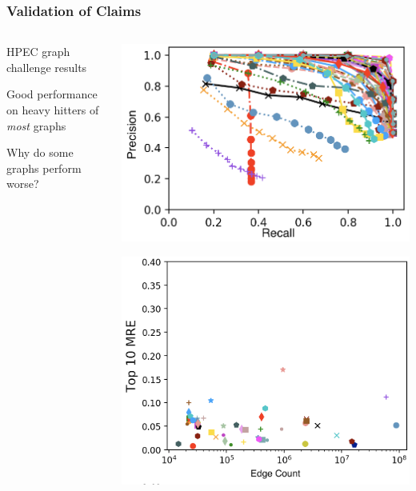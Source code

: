 \documentclass{beamer}
\begin{document}
\begin{frame}
\frametitle{Validation of Claims}

\begin{columns}
	\begin{column}{0.2\textwidth}
		\begin{block}{}
			HPEC graph challenge results
		\end{block}
		\begin{block}{}
			Good performance  on heavy hitters of \emph{most} graphs
		\end{block}
		\begin{block}{}
			Why do some graphs perform worse?
		\end{block}
	\end{column}
	\begin{column}{0.4\textwidth}
		\centerline{\includegraphics[width=1.0\columnwidth]{precision_vs_recall_top_10}}
		\centerline{\includegraphics[width=1.0\columnwidth]{errs_vs_E_top_10}}

\end{column}
\end{columns}
\end{frame}
\end{document}
